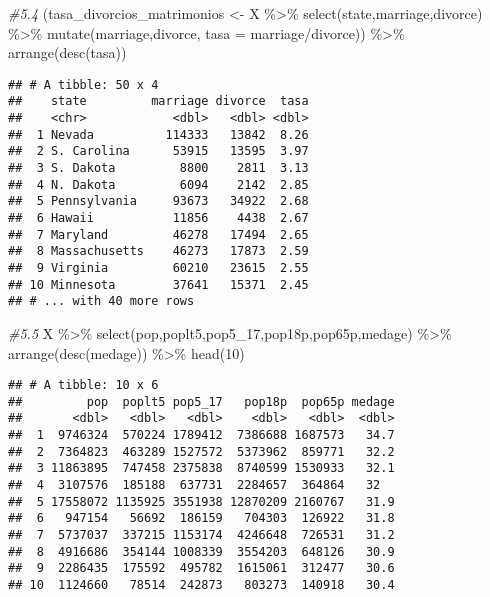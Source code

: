 \documentclass[
]{article}
\newenvironment{Shaded}{\begin{snugshade}}{\end{snugshade}}
\newcommand{\AttributeTok}[1]{\textcolor[rgb]{0.77,0.63,0.00}{#1}}
\newcommand{\CommentTok}[1]{\textcolor[rgb]{0.56,0.35,0.01}{\textit{#1}}}
\newcommand{\DecValTok}[1]{\textcolor[rgb]{0.00,0.00,0.81}{#1}}
\newcommand{\FunctionTok}[1]{\textcolor[rgb]{0.00,0.00,0.00}{#1}}
\newcommand{\NormalTok}[1]{#1}
\newcommand{\OtherTok}[1]{\textcolor[rgb]{0.56,0.35,0.01}{#1}}
\newcommand{\SpecialCharTok}[1]{\textcolor[rgb]{0.00,0.00,0.00}{#1}}
\begin{document}
\begin{Shaded}
\begin{Highlighting}[]
\CommentTok{\#5.4}
\NormalTok{(tasa\_divorcios\_matrimonios }\OtherTok{\textless{}{-}}\NormalTok{ X }\SpecialCharTok{\%\textgreater{}\%} \FunctionTok{select}\NormalTok{(state,marriage,divorce) }\SpecialCharTok{\%\textgreater{}\%} \FunctionTok{mutate}\NormalTok{(marriage,divorce, }\AttributeTok{tasa =}\NormalTok{ marriage}\SpecialCharTok{/}\NormalTok{divorce)) }\SpecialCharTok{\%\textgreater{}\%} \FunctionTok{arrange}\NormalTok{(}\FunctionTok{desc}\NormalTok{(tasa))}
\end{Highlighting}
\end{Shaded}

\begin{verbatim}
## # A tibble: 50 x 4
##    state         marriage divorce  tasa
##    <chr>            <dbl>   <dbl> <dbl>
##  1 Nevada          114333   13842  8.26
##  2 S. Carolina      53915   13595  3.97
##  3 S. Dakota         8800    2811  3.13
##  4 N. Dakota         6094    2142  2.85
##  5 Pennsylvania     93673   34922  2.68
##  6 Hawaii           11856    4438  2.67
##  7 Maryland         46278   17494  2.65
##  8 Massachusetts    46273   17873  2.59
##  9 Virginia         60210   23615  2.55
## 10 Minnesota        37641   15371  2.45
## # ... with 40 more rows
\end{verbatim}

\begin{Shaded}
\begin{Highlighting}[]
\CommentTok{\#5.5}
\NormalTok{X }\SpecialCharTok{\%\textgreater{}\%} \FunctionTok{select}\NormalTok{(pop,poplt5,pop5\_17,pop18p,pop65p,medage) }\SpecialCharTok{\%\textgreater{}\%} \FunctionTok{arrange}\NormalTok{(}\FunctionTok{desc}\NormalTok{(medage)) }\SpecialCharTok{\%\textgreater{}\%} \FunctionTok{head}\NormalTok{(}\DecValTok{10}\NormalTok{)}
\end{Highlighting}
\end{Shaded}

\begin{verbatim}
## # A tibble: 10 x 6
##         pop  poplt5 pop5_17   pop18p  pop65p medage
##       <dbl>   <dbl>   <dbl>    <dbl>   <dbl>  <dbl>
##  1  9746324  570224 1789412  7386688 1687573   34.7
##  2  7364823  463289 1527572  5373962  859771   32.2
##  3 11863895  747458 2375838  8740599 1530933   32.1
##  4  3107576  185188  637731  2284657  364864   32  
##  5 17558072 1135925 3551938 12870209 2160767   31.9
##  6   947154   56692  186159   704303  126922   31.8
##  7  5737037  337215 1153174  4246648  726531   31.2
##  8  4916686  354144 1008339  3554203  648126   30.9
##  9  2286435  175592  495782  1615061  312477   30.6
## 10  1124660   78514  242873   803273  140918   30.4
\end{verbatim}
\end{document}
